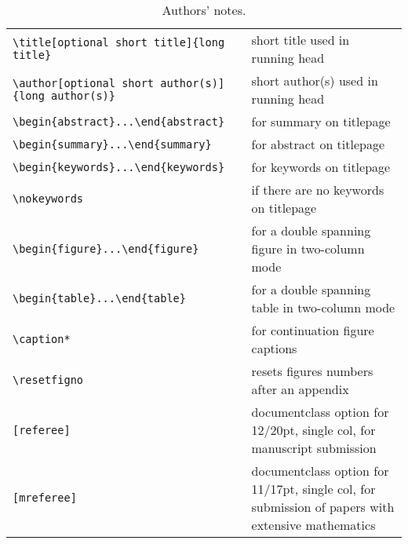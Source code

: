 \documentclass{gji}
\begin{document}
\begin{table*}
\begin{minipage}{130mm}
\caption{Authors' notes.}
\label{authors}
\begin{tabular}{@{}ll}
\verb"\title[optional short title]{long title}"
                    & short title used in running head\\
\verb"\author[optional short author(s)]{long author(s)}"
                    & short author(s) used in running head\\
\verb"\begin{abstract}...\end{abstract}"& for summary on
titlepage\\
\verb"\begin{summary}...\end{summary}"& for abstract on
titlepage\\
\verb"\begin{keywords}...\end{keywords}"& for keywords on titlepage\\
\verb"\nokeywords"  & if there are no keywords on titlepage\\
\verb"\begin{figure*}...\end{figure*}" & for a double spanning figure in two-column mode\\
\verb"\begin{table*}...\end{table*}" & for a double spanning table in
                                       two-column mode\\
\verb"\caption*"    & for continuation figure captions\\
\verb"\resetfigno" & resets figures numbers after an appendix\\
\verb"[referee]" & documentclass option for 12/20pt, single col,
                   for manuscript submission\\
\verb"[mreferee]" & documentclass option for 11/17pt, single col,
                   for submission of papers with extensive mathematics\\
\end{tabular}
\end{minipage}
\end{table*}
%
\end{document}
